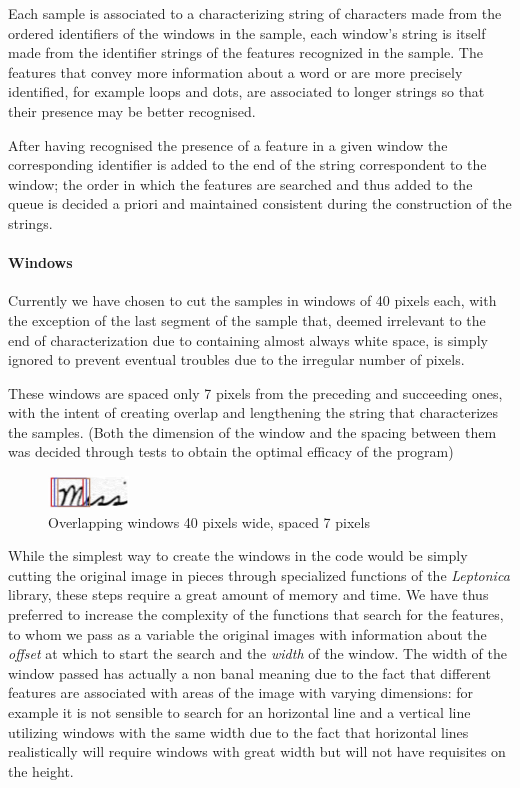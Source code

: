 Each sample is associated to a characterizing string of characters made from the ordered identifiers of the windows in the sample, each window's string is itself made from the identifier strings of the features recognized in the sample.
The features that convey more information about a word or are more precisely identified, for example loops and dots, are associated to longer strings so that their presence may be better recognised.

After having recognised the presence of a feature in a given window the corresponding identifier is added to the end of the string correspondent to the window; the order in which the features are searched and thus added to the queue is decided a priori and maintained consistent during the construction of the strings. 


\paragraph{Windows}

Currently we have chosen to cut the samples in windows of 40 pixels each, with the exception of the last segment of the sample that, deemed irrelevant to the end of characterization due to containing almost always white space, is simply ignored to prevent eventual troubles due to the irregular number of pixels.

These windows are spaced only 7 pixels from the preceding and succeeding ones, with the intent of creating overlap and lengthening the string that characterizes the samples.
(Both the dimension of the window and the spacing between them was decided through tests to obtain the optimal efficacy of the program)

\begin{figure}[!htpb]
\centering
\includegraphics[width=0.19\textwidth]{images/sliding.jpg}
\caption{Overlapping windows 40 pixels wide, spaced 7 pixels}
\end{figure} 



While the simplest way to create the windows in the code would be simply cutting the original image in pieces through specialized functions of the \textit{Leptonica} library, these steps require a great amount of memory and time. We have thus preferred to increase the complexity of the functions that search for the features, to whom we pass as a variable the original images with information about the \textit{offset} at which to start the search and the \textit{width} of the window. The width of the window passed has actually a non banal meaning due to the fact that different features are associated with areas of the image with varying dimensions: for example it is not sensible to search for an horizontal line and a vertical line utilizing windows with the same width due to the fact that horizontal lines realistically will require windows with great width but will not have requisites on the height.


